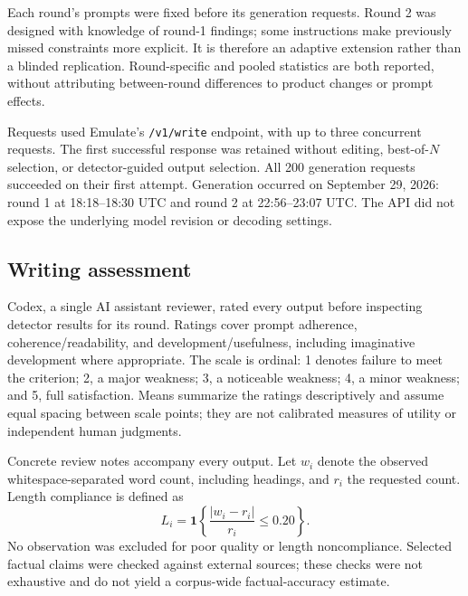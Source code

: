 \documentclass[11pt]{article}
\begin{document}
Each round's prompts were fixed before its generation requests. Round 2 was designed with knowledge of round-1 findings; some instructions make previously missed constraints more explicit. It is therefore an adaptive extension rather than a blinded replication. Round-specific and pooled statistics are both reported, without attributing between-round differences to product changes or prompt effects.

Requests used Emulate's \texttt{/v1/write} endpoint, with up to three concurrent requests. The first successful response was retained without editing, best-of-$N$ selection, or detector-guided output selection. All 200 generation requests succeeded on their first attempt. Generation occurred on September 29, 2026: round 1 at 18:18--18:30 UTC and round 2 at 22:56--23:07 UTC. The API did not expose the underlying model revision or decoding settings.

\subsection{Writing assessment}
Codex, a single AI assistant reviewer, rated every output before inspecting detector results for its round. Ratings cover prompt adherence, coherence/readability, and development/usefulness, including imaginative development where appropriate. The scale is ordinal: 1 denotes failure to meet the criterion; 2, a major weakness; 3, a noticeable weakness; 4, a minor weakness; and 5, full satisfaction. Means summarize the ratings descriptively and assume equal spacing between scale points; they are not calibrated measures of utility or independent human judgments.

Concrete review notes accompany every output. Let $w_i$ denote the observed whitespace-separated word count, including headings, and $r_i$ the requested count. Length compliance is defined as
\begin{equation}
 L_i=\mathbf{1}\!\left\{\frac{|w_i-r_i|}{r_i}\leq 0.20\right\}.
\end{equation}
No observation was excluded for poor quality or length noncompliance. Selected factual claims were checked against external sources; these checks were not exhaustive and do not yield a corpus-wide factual-accuracy estimate.
\end{document}
